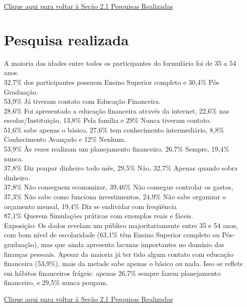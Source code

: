 \documentclass[
	article,			%
	12pt,				%
	oneside,			%
	a4paper,			%
	english,			%
	brazil,				%
	sumario=tradicional
	]{abntex2}
\begin{document}
\newpage
\begin{apendicesenv}
 {\Large
\begin{center}
    \bigskip
\noindent\hyperref[subsec:pesquisas]{Clique aqui para voltar à Seção 2.1 Pesquisas Realizadas}
\end{center}
}
\chapter{Pesquisa realizada}
\label{chap:apendiceA}
  {\Large
    A maioria das idades entre todos os participantes do formulário foi de 35 a 54 anos.\\ 
    32,7\%  dos participantes possuem Ensino Superior completo e 30,4\% Pós Graduação. \\
    53,9\%  Já tiveram contato com Educação Financeira. \\
    28,6\%  Foi apresentado a educação financeira através da internet, 22,6\% nas escolas/Instituição, 13,8\% Pela família e 29\% Nunca tiveram contato. \\
    51,6\%  sabe apenas o básico, 27,6\% tem conhecimento intermediário, 8,8\% Conhecimento  Avançado e 12\% Nenhum. \\
    53,9\% Às vezes realizam um planejamento financeiro, 26,7\% Sempre, 19,4\% nunca. \\
    37,8\% Diz poupar dinheiro todo mês, 29,5\% Não, 32,7\% Apenas quando sobra dinheiro. \\
    37,8\% Não conseguem economizar, 39,46\% Não consegue controlar os gastos, 37,3\% Não sabe como funciona investimentos, 24,9\% Não sabe organizar o orçamento mensal,  19,4\% Diz se endividar com freqüência \\
    87,1\% Querem Simulações práticas com exemplos reais e fáceis. \\
    Exposição: 
    Os dados revelam um público majoritariamente entre 35 e 54 anos, com bom nível de  escolaridade (63,1\% têm Ensino Superior completo ou Pós-graduação), mas que ainda apresenta lacunas importantes no domínio das finanças pessoais. Apesar da maioria já ter tido algum contato com educação financeira (53,9\%), mais da metade sabe apenas o básico ou nada. Isso se reflete em hábitos financeiros frágeis: apenas 26,7\% sempre fazem planejamento financeiro, e 29,5\% nunca poupam.
    
\begin{center}
    \bigskip
\noindent\hyperref[subsec:pesquisas]{Clique aqui para voltar à Seção 2.1 Pesquisas Realizadas}
\end{center}

}
\end{apendicesenv}
\end{document}
